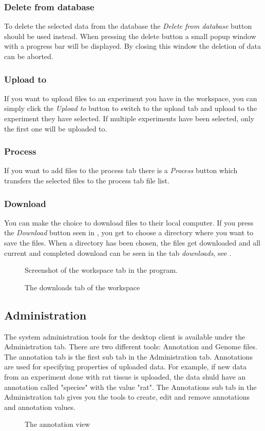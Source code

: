 \subsubsection{Delete from database}
To delete the selected data from the database the \emph{Delete from database} button should be used instead. When pressing the delete button a small popup window with a progress bar will be displayed. By closing this window the deletion of data can be aborted.
\subsubsection{Upload to}
If you want to upload files to an experiment you have in the workspace, you can simply click the \emph{Upload to} button to switch to the upload tab and upload to the experiment they have selected. If multiple experiments have been selected, only the first one will be uploaded to.
\subsubsection{Process}
If you want to add files to the process tab there is a \emph{Process} button which transfers the selected files to the process tab file list.
\subsubsection{Download}
You can make the choice to download files to their local computer. If you press the \emph{Download} button seen in , you get to choose a directory where you want to save the files. When a directory has been chosen, the files get downloaded and all current and completed download can be seen in the tab \emph{downloads}, see .
\begin{figure}[htb]
	\caption{Screenshot of the workspace tab in the program.}
	\label{fig:des_workspace-view}
\end{figure}
\begin{figure}[htb]
	\caption{The downloads tab of the workspace}
	\label{fig:des_download-view}
\end{figure}
\FloatBarrier

\subsection{Administration}
The system administration tools for the desktop client is available under the Administration tab. There are two different tools: Annotation and Genome files. The annotation tab is the first sub tab in the Administration tab. Annotations are used for specifying properties of uploaded data. For example, if new data from an experiment done with rat tissue is uploaded, the data shuld have an annotation called "species" with the value "rat". The Annotations sub tab in the Administration tab gives you the tools to create, edit and remove annotations and annotation values. 
\begin{figure}[htb]
	\caption{The annotation view}
	\label{fig:annotationsView}
\end{figure}

